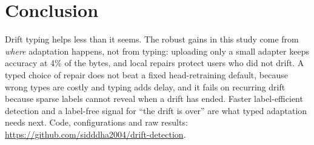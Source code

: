 \documentclass[conference]{IEEEtran}
\newif\ifblind
\newcommand{\codeurl}{\ifblind an anonymised repository (link withheld for review)\else\url{https://github.com/sidddha2004/drift-detection}\fi}
\begin{document}
\section{Conclusion}
Drift typing helps less than it seems. The robust gains in this study come from \emph{where} adaptation happens, not from typing: uploading only a small adapter keeps accuracy at 4\% of the bytes, and local repairs protect users who did not drift. A typed choice of repair does not beat a fixed head-retraining default, because wrong types are costly and typing adds delay, and it fails on recurring drift because sparse labels cannot reveal when a drift has ended. Faster label-efficient detection and a label-free signal for ``the drift is over'' are what typed adaptation needs next. Code, configurations and raw results: \codeurl.



\end{document}
